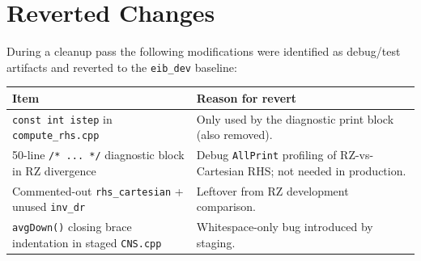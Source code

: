 \documentclass[11pt,a4paper]{article}
\begin{document}
\section{Reverted Changes}

During a cleanup pass the following modifications were identified as
debug/test artifacts and reverted to the \texttt{eib\_dev} baseline:

\begin{longtable}{p{4.5cm} p{9cm}}
\toprule
\textbf{Item} & \textbf{Reason for revert} \\
\midrule
\texttt{const int istep} in \texttt{compute\_rhs.cpp}
  & Only used by the diagnostic print block (also removed). \\
50-line \texttt{/* ... */} diagnostic block in RZ divergence
  & Debug \texttt{AllPrint} profiling of RZ-vs-Cartesian RHS; not needed
    in production. \\
Commented-out \texttt{rhs\_cartesian} + unused \texttt{inv\_dr}
  & Leftover from RZ development comparison. \\
\texttt{avgDown()} closing brace indentation in staged \texttt{CNS.cpp}
  & Whitespace-only bug introduced by staging. \\
\bottomrule
\end{longtable}
\end{document}
